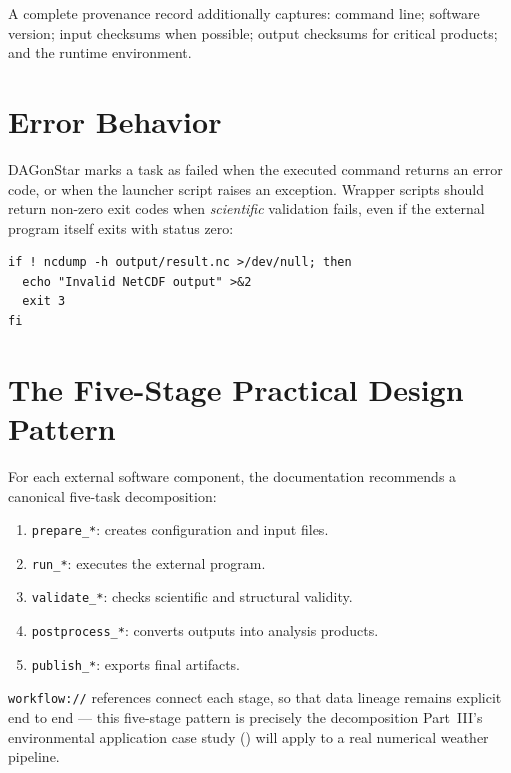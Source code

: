 A complete provenance record additionally captures: command line; software
version; input checksums when possible; output checksums for critical
products; and the runtime environment.

\section{Error Behavior}

DAGonStar marks a task as failed when the executed command returns an error
code, or when the launcher script raises an exception. Wrapper scripts
should return non-zero exit codes when \emph{scientific} validation fails,
even if the external program itself exits with status zero:

\begin{lstlisting}[style=bash]
if ! ncdump -h output/result.nc >/dev/null; then
  echo "Invalid NetCDF output" >&2
  exit 3
fi
\end{lstlisting}

\section{The Five-Stage Practical Design Pattern}

For each external software component, the documentation recommends a
canonical five-task decomposition:

\begin{enumerate}[leftmargin=1.6em]
  \item \texttt{prepare\_*}: creates configuration and input files.
  \item \texttt{run\_*}: executes the external program.
  \item \texttt{validate\_*}: checks scientific and structural validity.
  \item \texttt{postprocess\_*}: converts outputs into analysis products.
  \item \texttt{publish\_*}: exports final artifacts.
\end{enumerate}

\texttt{workflow://} references connect each stage, so that data lineage
remains explicit end to end --- this five-stage pattern is precisely the
decomposition Part~III's environmental application case study ()
will apply to a real numerical weather pipeline.

